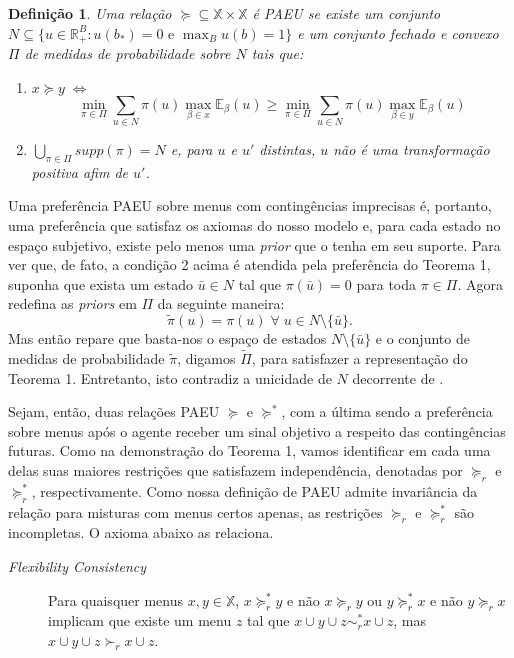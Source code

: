 \documentclass[11pt, a4paper]{article}
\theoremstyle{nonumberplain}
\theoremstyle{plain}
\theoremstyle{plain}
\theoremstyle{plain}
\theoremstyle{nonumberplain}
\newtheorem{defi}{Definição}
\begin{document}
\begin{defi}
Uma relação $\succcurlyeq\subseteq\mathbb{X}\times\mathbb{X}$ é PAEU se existe um conjunto $N\subseteq \{u \in \mathbb{R}^B_+:u(b_*)=0\text { e }\max_{B}u(b)=1\}$ e um conjunto fechado e convexo $\Pi$ de medidas de probabilidade sobre $N$ tais que:
\begin{enumerate}[1.]
\item $x \succcurlyeq y \;\Leftrightarrow\;$ $$\min_{\pi\in\Pi}\sum_{u\in N} \pi(u)\max_{\beta\in x}\mathbb{E}_\beta(u)\geq \min_{\pi\in\Pi}\sum_{u\in N} \pi(u)\max_{\beta\in y}\mathbb{E}_\beta(u)$$
\item $\bigcup_{\pi\in\Pi}supp(\pi)=N$ e, para $u$ e $u'$ distintas, $u$ não é uma transformação positiva afim de $u'$.
\end{enumerate}
\end{defi}

Uma preferência PAEU sobre menus com contingências imprecisas é, portanto, uma preferência que satisfaz os axiomas do nosso modelo e, para cada estado no espaço subjetivo, existe pelo menos uma \emph{prior} que o tenha em seu suporte. Para ver que, de fato, a condição 2 acima é atendida pela preferência do Teorema 1, suponha que exista um estado $\bar{u}\in N$ tal que $\pi(\bar{u})=0$ para toda $\pi\in\Pi$. Agora redefina as \emph{priors} em $\Pi$ da seguinte maneira: $$\tilde{\pi}(u)=\pi(u)\;\forall\; u\in N\setminus\{\bar{u}\}.$$    
Mas então repare que basta-nos o espaço de estados $N\setminus\{\bar{u}\}$ e o conjunto de medidas de probabilidade $\tilde{\pi}$, digamos $\tilde{\Pi}$, para satisfazer a representação do Teorema 1. Entretanto, isto contradiz a unicidade de $N$ decorrente de \cite{Kochov2007}. 

Sejam, então, duas relações PAEU $\succcurlyeq$ e $\succcurlyeq^*$, com a última sendo a preferência sobre menus após o agente receber um sinal objetivo a respeito das contingências futuras. Como na demonstração do Teorema 1, vamos identificar em cada uma delas suas maiores restrições que satisfazem independência, denotadas por $\succcurlyeq_r$ e $\succcurlyeq^*_r$, respectivamente. Como nossa definição de PAEU admite invariância da relação para misturas com menus certos apenas, as restrições $\succcurlyeq_r$ e $\succcurlyeq^*_r$ são incompletas. O axioma abaixo as relaciona.

\begin{description}
\item[\emph{Flexibility Consistency}\citep{Moura2013}] Para quaisquer menus $x,y\in \mathbb{X}$, $x\succcurlyeq^*_r y$ e não $x\succcurlyeq_r y$ ou $y\succcurlyeq^*_r x$ e não $y\succcurlyeq_r x$ implicam que existe um menu $z$ tal que $x\cup y\cup z \sim^*_r x\cup z$, mas $x\cup y\cup z \succ_r x\cup z$.
\end{description}
\end{document}
